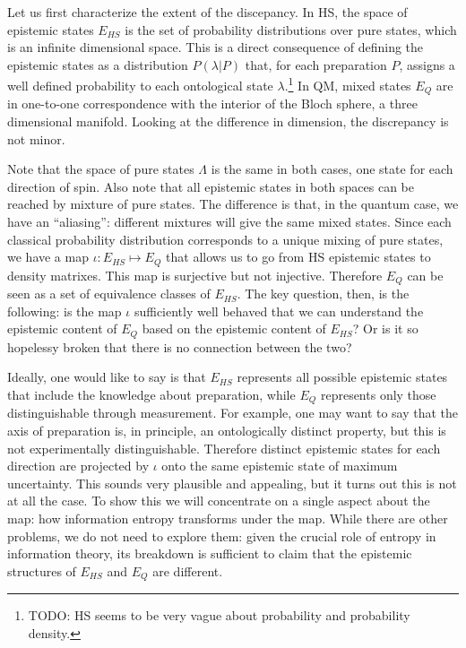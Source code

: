 \documentclass[10pt,twocolumn, nofootinbib]{revtex4-2}
\begin{document}
Let us first characterize the extent of the discepancy. In HS, the space of epistemic states $E_{HS}$ is the set of probability distributions over pure states, which is an infinite dimensional space. This is a direct consequence of defining the epistemic states as a distribution $P(\lambda|P)$ that, for each preparation $P$, assigns a well defined probability to each ontological state $\lambda$.\footnote{TODO: HS seems to be very vague about probability and probability density.} In QM, mixed states $E_{Q}$ are in one-to-one correspondence with the interior of the Bloch sphere, a three dimensional manifold. Looking at the difference in dimension, the discrepancy is not minor.

Note that the space of pure states $\Lambda$ is the same in both cases, one state for each direction of spin. Also note that all epistemic states in both spaces can be reached by mixture of pure states. The difference is that, in the quantum case, we have an ``aliasing'': different mixtures will give the same mixed states. Since each classical probability distribution corresponds to a unique mixing of pure states, we have a map $\iota : E_{HS} \mapsto E_{Q}$ that allows us to go from HS epistemic states to density matrixes. This map is surjective but not injective. Therefore $E_{Q}$ can be seen as a set of equivalence classes of $E_{HS}$. The key question, then, is the following: is the map $\iota$ sufficiently well behaved that we can understand the epistemic content of $E_{Q}$ based on the epistemic content of $E_{HS}$? Or is it so hopelessy broken that there is no connection between the two?

Ideally, one would like to say is that $E_{HS}$ represents all possible epistemic states that include the knowledge about preparation, while $E_{Q}$ represents only those distinguishable through measurement. For example, one may want to say that the axis of preparation is, in principle, an ontologically distinct property, but this is not experimentally distinguishable. Therefore distinct epistemic states for each direction are projected by $\iota$ onto the same epistemic state of maximum uncertainty. This sounds very plausible and appealing, but it turns out this is not at all the case. To show this we will concentrate on a single aspect about the map: how information entropy transforms under the map. While there are other problems, we do not need to explore them: given the crucial role of entropy in information theory, its breakdown is sufficient to claim that the epistemic structures of $E_{HS}$ and $E_{Q}$ are different.
\end{document}
